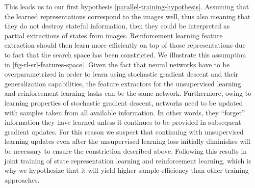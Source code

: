 This leads us to our first hypothesis \ref{parallel-training-hypothesis}.
Assuming that the learned representations correspond to the images well,
thus also meaning that they do not destroy stateful information,
then they could be interpreted as partial extractions of states from images.
Reinforcement learning feature extraction should then learn more efficiently on top of those representations
due to fact that the search space has been constricted.
We illustrate this assumption in \ref{fig-rl-srl-features-space}.
Given the fact that neural networks have to be overparametrized in order to learn
using stochastic gradient descent and their generalization capabilities,
the feature extractors for the unsupervised learning and reinforcement learning tasks
can be the same network.
Furthermore, owing to learning properties of stochastic gradient descent,
networks need to be updated with samples taken from all available information.
In other words, they ``forget'' information they have learned unless it continues 
to be provided in subsequent gradient updates.
For this reason we suspect that continuing with unsupervised learning updates
even after the unsupervised learning loss initially diminishes
will be necessary to ensure the constriction described above.
Following this results in joint training of state representation learning
and reinforcement learning, which is why we hypothesize that it will yield higher
sample-efficiency than other training approaches.




